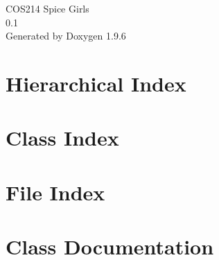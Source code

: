 \documentclass[twoside]{book}
\newcommand{\+}{\discretionary{\mbox{\scriptsize$\hookleftarrow$}}{}{}}
\newcommand{\clearemptydoublepage}{%
    \newpage{\pagestyle{empty}\cleardoublepage}%
  }
\begin{document}
  \raggedbottom
    \hypersetup{pageanchor=false,
                bookmarksnumbered=true,
                pdfencoding=unicode
               }
  \begin{titlepage}
  \vspace*{7cm}
  \begin{center}%
  {\Large COS214 Spice Girls}\\
  [1ex]\large 0.\+1 \\
  \vspace*{1cm}
  {\large Generated by Doxygen 1.9.6}\\
  \end{center}
  \end{titlepage}
  \clearemptydoublepage
  \tableofcontents
  \clearemptydoublepage
  \hypersetup{pageanchor=true}
\chapter{Hierarchical Index}

\chapter{Class Index}

\chapter{File Index}

\chapter{Class Documentation}



































\end{document}
